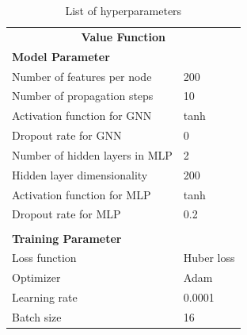 \documentclass[fullpage,twocolumn]{article} %
\begin{document}

\begin{table}
  \centering
  \caption{List of hyperparameters}
  \begin{tabular}{ll}
    \toprule
    \multicolumn{2}{c}{{\bf Value Function}} \\
    {\bf Model Parameter}                        & \\ \midrule
    Number of features per node                  & 200 \\
    Number of propagation steps                  & 10 \\
    Activation function for GNN                  & tanh \\
    Dropout rate for GNN                         & 0 \\
    Number of hidden layers in MLP               & 2 \\
    Hidden layer dimensionality & 200 \\    
    Activation function for MLP                  & tanh \\
    Dropout rate for MLP                         & 0.2 \\
    \\
    {\bf Training Parameter}                     &  \\
    Loss function                                & Huber loss \\
    Optimizer                                    & Adam  \\
    Learning rate                                & 0.0001 \\
    Batch size                                   & 16 \\
    \bottomrule
  \end{tabular}
  \label{tbl:hyperparameters}
\end{table}
\end{document}
